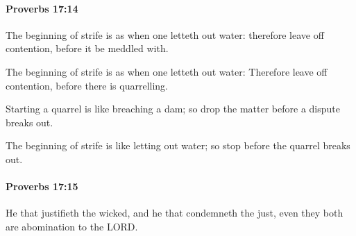 		\paragraph{Proverbs 17:14} %
			\label{PROVERBS-17-14}

			The beginning of strife is as when one letteth out water: therefore leave off contention, before it be meddled with.

			\begin{versebox}
					\item[BHS] 
					\item[ASV] The beginning of strife is as when one letteth out water: Therefore leave off contention, before there is quarrelling.
					\item[NIV] Starting a quarrel is like breaching a dam; so drop the matter before a dispute breaks out.
					\item[NRSV] The beginning of strife is like letting out water; so stop before the quarrel breaks out.
			\end{versebox}

		\paragraph{Proverbs 17:15} %
			\label{PROVERBS-17-15}

			He that justifieth the wicked, and he that condemneth the just, even they both are abomination to the LORD.

